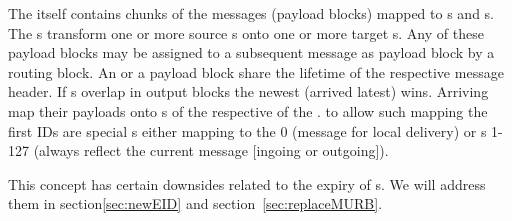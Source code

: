 The  itself contains chunks of the messages (payload blocks) mapped to s and s. The s transform one or more source s onto one or more target s. Any of these payload blocks may be assigned to a subsequent message as payload block by a routing block. An  or a payload block share the lifetime of the respective message header. If s overlap in output blocks the newest  (arrived latest) wins. Arriving \VortexMessages{} map their payloads onto s of the respective  of the . to allow such mapping the first IDs are special s either mapping to the  0 (message for local delivery) or s 1-127 (always reflect the current message [ingoing or outgoing]).

This concept has certain downsides related to the expiry of s. We will address them in section\ref{sec:newEID} and section~\ref{sec:replaceMURB}.

